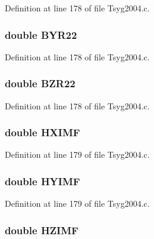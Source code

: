 Definition at line 178 of file Tsyg2004.c.\hypertarget{struct___t_s04_info_fe8d51a2854838075c65ba5f9453d068}{
\subsubsection[{BYR22}]{\setlength{\rightskip}{0pt plus 5cm}double {\bf BYR22}}}
\label{struct___t_s04_info_fe8d51a2854838075c65ba5f9453d068}




Definition at line 178 of file Tsyg2004.c.\hypertarget{struct___t_s04_info_417f542193c123afb851fb9ae24759d1}{
\subsubsection[{BZR22}]{\setlength{\rightskip}{0pt plus 5cm}double {\bf BZR22}}}
\label{struct___t_s04_info_417f542193c123afb851fb9ae24759d1}




Definition at line 178 of file Tsyg2004.c.\hypertarget{struct___t_s04_info_8b072a2e8afac1c3e168f081f7f29907}{
\subsubsection[{HXIMF}]{\setlength{\rightskip}{0pt plus 5cm}double {\bf HXIMF}}}
\label{struct___t_s04_info_8b072a2e8afac1c3e168f081f7f29907}




Definition at line 179 of file Tsyg2004.c.\hypertarget{struct___t_s04_info_badd0ee294949123f5a7481e23ec4f5e}{
\subsubsection[{HYIMF}]{\setlength{\rightskip}{0pt plus 5cm}double {\bf HYIMF}}}
\label{struct___t_s04_info_badd0ee294949123f5a7481e23ec4f5e}




Definition at line 179 of file Tsyg2004.c.\hypertarget{struct___t_s04_info_33e244d5c4043dd47a4c55a6fcdab2e3}{
\subsubsection[{HZIMF}]{\setlength{\rightskip}{0pt plus 5cm}double {\bf HZIMF}}}
\label{struct___t_s04_info_33e244d5c4043dd47a4c55a6fcdab2e3}




